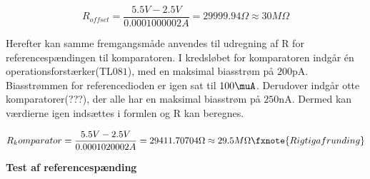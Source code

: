 \begin{equation}
R_{offset}=\frac{5.5V-2.5V}{0.0001000002A}=29999.94\Omega \approx 30M\Omega
\end{equation}  

Herefter kan samme fremgangsmåde anvendes til udregning af R for referencespændingen til komparatoren. I kredsløbet for komparatoren indgår én operationsforstærker(TL$081$), med en maksimal biasstrøm på $200$pA. Biasstrømmen for referencedioden er igen sat til $100\muA$. Derudover indgår otte komparatorer(???), der alle har en maksimal biasstrøm på $250$nA. Dermed kan værdierne igen indsættes i formlen og R kan beregnes.

\begin{equation}
R_komparator=\frac{5.5V-2.5V}{0.0001020002A}=29411.70704\Omega \approx 29.5M\Omega \fxnote{Rigtig afrunding}
\end{equation} 

\textbf{Test af referencespænding}


 